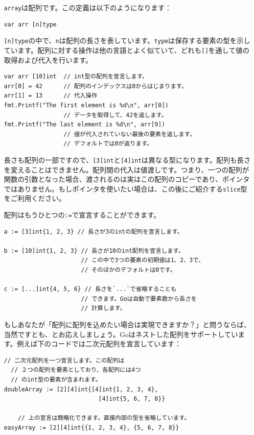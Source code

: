 \texttt{array}は配列です。この定義は以下のようになります：

\begin{lstlisting}[numbers=none]
var arr [n]type
\end{lstlisting}

\texttt{[n]type}の中で、\texttt{n}は配列の長さを表しています。\texttt{type}は保存する要素の型を示しています。配列に対する操作は他の言語とよく似ていて、どれも\texttt{[]}を通して値の取得および代入を行います。

\begin{lstlisting}[numbers=none]
var arr [10]int  // int型の配列を宣言します。
arr[0] = 42      // 配列のインデックスは0からはじまります。
arr[1] = 13      // 代入操作
fmt.Printf("The first element is %d\n", arr[0])
                 // データを取得して、42を返します。
fmt.Printf("The last element is %d\n", arr[9])
                 // 値が代入されていない最後の要素を返します。
                 // デフォルトでは0が返ります。
\end{lstlisting}

長さも配列の一部ですので、\texttt{[3]int}と\texttt{[4]int}は異なる型になります。配列も長さを変えることはできません。配列間の代入は値渡しです。つまり、一つの配列が関数の引数となった場合、渡されるのは実はこの配列のコピーであり、ポインタではありません。もしポインタを使いたい場合は、この後にご紹介する\texttt{slice}型をご利用ください。

配列はもうひとつの\texttt{:=}で宣言することができます。

\begin{lstlisting}[numbers=none]
a := [3]int{1, 2, 3} // 長さが3のintの配列を宣言します。

b := [10]int{1, 2, 3} // 長さが10のint配列を宣言します。
                      // この中で3つの要素の初期値は1、2、3で、
                      // そのほかのデフォルトは0です。

c := [...]int{4, 5, 6} // 長さを`...`で省略することも
                      // できます。Goは自動で要素数から長さを
                      // 計算します。
\end{lstlisting}

もしあなたが「配列に配列を込めたい場合は実現できますか？」と問うならば、当然ですとも、とお応えしましょう。Goはネストした配列をサポートしています。例えば下のコードでは二次元配列を宣言しています：


\begin{lstlisting}[numbers=none]
  // 二次元配列を一つ宣言します。この配列は
  // ２つの配列を要素としており、各配列には4つ
  // のint型の要素が含まれます。
doubleArray := [2][4]int{[4]int{1, 2, 3, 4},
                           [4]int{5, 6, 7, 8}}

    // 上の宣言は簡略化できます。直接内部の型を省略しています。
easyArray := [2][4]int{{1, 2, 3, 4}, {5, 6, 7, 8}}
\end{lstlisting}

